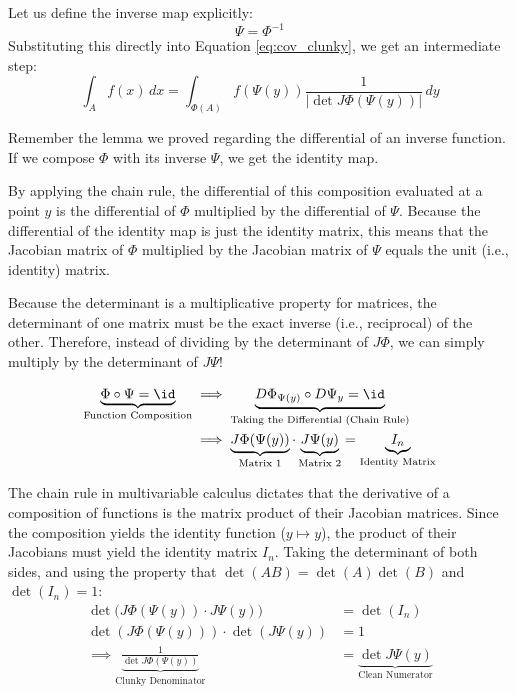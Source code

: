 \begin{math-stroke}
Let us define the inverse map explicitly:
\[
\Psi = \Phi^{-1}
\]
Substituting this directly into Equation \ref{eq:cov_clunky}, we get an intermediate step:
\[
\int_A f(x) \, dx = \int_{\Phi(A)} f(\Psi(y)) \frac{1}{|\det J\Phi(\Psi(y))|} \, dy
\]
\end{math-stroke}

\begin{spoken-clean}[00:08:20 - 00:10:45]
Remember the lemma we proved regarding the differential of an inverse function. If we compose $\Phi$ with its inverse $\Psi$, we get the identity map. 

By applying the chain rule, the differential of this composition evaluated at a point $y$ is the differential of $\Phi$ multiplied by the differential of $\Psi$. Because the differential of the identity map is just the identity matrix, this means that the Jacobian matrix of $\Phi$ multiplied by the Jacobian matrix of $\Psi$ equals the unit (i.e., identity) matrix.

Because the determinant is a multiplicative property for matrices, the determinant of one matrix must be the exact inverse (i.e., reciprocal) of the other. Therefore, instead of dividing by the determinant of $J\Phi$, we can simply multiply by the determinant of $J\Psi$!
\end{spoken-clean}

\begin{math-stroke}
\begin{align*}
\underbrace{\Phi \circ \Psi = \id}_{\text{Function Composition}} &\implies \underbrace{D\Phi_{\Psi(y)} \circ D\Psi_y = \id}_{\text{Taking the Differential (Chain Rule)}} \\
&\implies \underbrace{J\Phi(\Psi(y))}_{\text{Matrix 1}} \cdot \underbrace{J\Psi(y)}_{\text{Matrix 2}} = \underbrace{I_n}_{\text{Identity Matrix}}
\end{align*}

\begin{explanation-of-steps}
The chain rule in multivariable calculus dictates that the derivative of a composition of functions is the matrix product of their Jacobian matrices. Since the composition yields the identity function ($y \mapsto y$), the product of their Jacobians must yield the identity matrix $I_n$. 
Taking the determinant of both sides, and using the property that $\det(AB) = \det(A)\det(B)$ and $\det(I_n) = 1$:
\begin{align*}
\det\Big( J\Phi(\Psi(y)) \cdot J\Psi(y) \Big) &= \det(I_n) \\
\det(J\Phi(\Psi(y))) \cdot \det(J\Psi(y)) &= 1 \\
\implies \underbrace{\frac{1}{\det J\Phi(\Psi(y))}}_{\text{Clunky Denominator}} &= \underbrace{\det J\Psi(y)}_{\text{Clean Numerator}}
\end{align*}
\end{explanation-of-steps}
\end{math-stroke}

